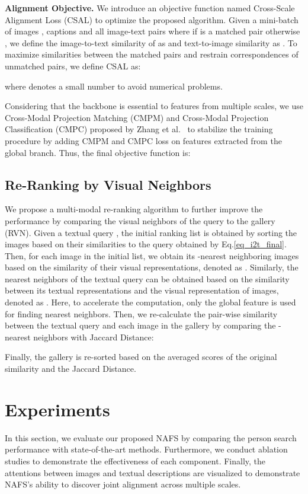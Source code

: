 \documentclass[final]{cvpr}
\begin{document}
\textbf{Alignment Objective.} We introduce an objective function named Cross-Scale Alignment Loss (CSAL) to optimize the proposed algorithm. Given a mini-batch of images , captions  and all image-text pairs  where  if  is a matched pair otherwise , we define the image-to-text similarity of  as  and text-to-image similarity as . To maximize similarities between the matched pairs and restrain correspondences of unmatched pairs, we define CSAL as:

where  denotes a small number to avoid numerical problems.

Considering that the backbone is essential to features from multiple scales, we use Cross-Modal Projection Matching (CMPM)  and Cross-Modal Projection Classification  (CMPC) proposed by Zhang et al.~\cite{zhang2018deep} to stabilize the training procedure by adding CMPM and CMPC loss on features extracted from the global branch. Thus, the final objective function is:






\subsection{Re-Ranking by Visual Neighbors}
We propose a multi-modal re-ranking algorithm to further improve the performance by comparing the visual neighbors of the query to the gallery (RVN). 
Given a textual query , the initial ranking list is obtained by sorting the images based on their similarities to the query obtained by Eq.\ref{eq_i2t_final}. 
Then, for each image  in the initial list, we obtain its -nearest neighboring images based on the similarity of their visual representations, denoted as . 
Similarly, the nearest neighbors of the textual query can be obtained based on the similarity between its textual representations and the visual representation of images, denoted as . 
Here, to accelerate the computation, only the global feature is used for finding nearest neighbors. Then, we re-calculate the pair-wise similarity between the textual query and each image in the gallery by comparing the -nearest neighbors with Jaccard Distance: 

Finally, the gallery is re-sorted based on the averaged scores of the original similarity and the Jaccard Distance. 

\section{Experiments}
In this section, we evaluate our proposed NAFS by comparing the person search performance with state-of-the-art methods. Furthermore, we conduct ablation studies to demonstrate the effectiveness of each component. Finally, the attentions between images and textual descriptions are visualized to demonstrate NAFS's ability to discover joint alignment across multiple scales.
\end{document}
